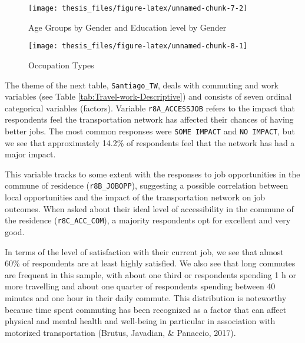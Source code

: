 \documentclass[
11pt, %
oneside, %
english, %
singlespacing, %
]{macthesis} %
\begin{document}
\begin{figure}

{\centering \texttt{[image: thesis\_files/figure-latex/unnamed-chunk-7-2]} 

}

\caption{\label{fig:Education and age by gender}Age Groups by Gender and Education level by Gender}\label{fig:unnamed-chunk-7-2}
\end{figure}
\begin{figure}

{\centering \texttt{[image: thesis\_files/figure-latex/unnamed-chunk-8-1]} 

}

\caption{\label{fig:Occupation type graph}Occupation Types}\label{fig:unnamed-chunk-8}
\end{figure}
The theme of the next table, \texttt{Santiago\_TW}, deals with commuting and work variables (see Table \ref{tab:Travel-work-Descriptive}) and consists of seven ordinal categorical variables (factors). Variable \texttt{r8A\_ACCESSJOB} refers to the impact that respondents feel the transportation network has affected their chances of having better jobs. The most common responses were \texttt{SOME\ IMPACT} and \texttt{NO\ IMPACT}, but we see that approximately 14.2\% of respondents feel that the network has had a major impact.

This variable tracks to some extent with the responses to job opportunities in the commune of residence (\texttt{r8B\_JOBOPP}), suggesting a possible correlation between local opportunities and the impact of the transportation network on job outcomes. When asked about their ideal level of accessibility in the commune of the residence (\texttt{r8C\_ACC\_COM}), a majority respondents opt for excellent and very good.

In terms of the level of satisfaction with their current job, we see that almost 60\% of respondents are at least highly satisfied. We also see that long commutes are frequent in this sample, with about one third or respondents spending 1 h or more travelling and about one quarter of respondents spending between 40 minutes and one hour in their daily commute. This distribution is noteworthy because time spent commuting has been recognized as a factor that can affect physical and mental health and well-being in particular in association with motorized transportation (Brutus, Javadian, \& Panaccio, 2017).
\end{document}

